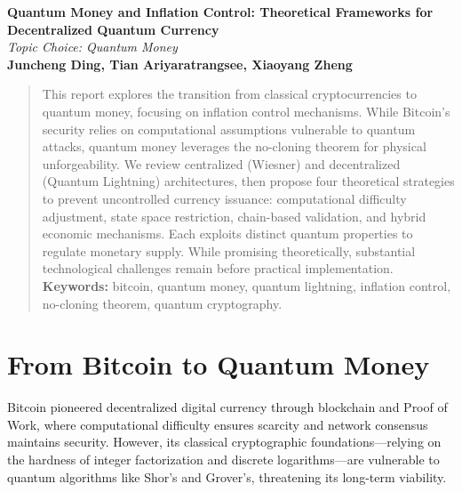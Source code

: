 \documentclass[a4paper,10.5pt,twoside]{article}
\begin{document}
\begin{center}
\LARGE
\textbf{Quantum Money and Inflation Control: Theoretical Frameworks for Decentralized Quantum Currency}\\[6pt]
\large
\textit{Topic Choice: Quantum Money}\\[11pt]
\normalsize
\textbf {Juncheng Ding, Tian Ariyaratrangsee, Xiaoyang Zheng}\\[4pt]
\end{center}

\begin{abstract}
\normalsize
This report explores the transition from classical cryptocurrencies to quantum money, focusing on inflation control mechanisms. While Bitcoin's security relies on computational assumptions vulnerable to quantum attacks, quantum money leverages the no-cloning theorem for physical unforgeability. We review centralized (Wiesner) and decentralized (Quantum Lightning) architectures, then propose four theoretical strategies to prevent uncontrolled currency issuance: computational difficulty adjustment, state space restriction, chain-based validation, and hybrid economic mechanisms. Each exploits distinct quantum properties to regulate monetary supply. While promising theoretically, substantial technological challenges remain before practical implementation.
\vskip 2mm
\textbf{Keywords:} bitcoin, quantum money, quantum lightning, inflation control, no-cloning theorem, quantum cryptography.
\end{abstract}

\section{From Bitcoin to Quantum Money}\label{s:1}

Bitcoin pioneered decentralized digital currency through blockchain and Proof of Work,\autocite{Nakamoto_2008} where computational difficulty ensures scarcity and network consensus maintains security. However, its classical cryptographic foundations—relying on the hardness of integer factorization and discrete logarithms—are vulnerable to quantum algorithms like Shor's\autocite{Shor_1997} and Grover's,\autocite{Grover_1996} threatening its long-term viability.
\end{document}

